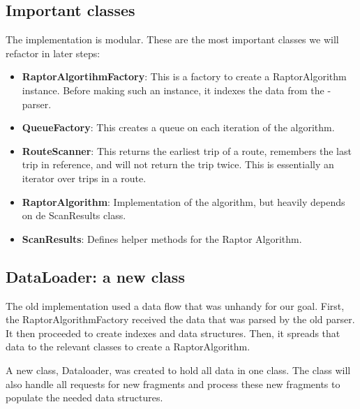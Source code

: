 \subsection{Important classes}
The  implementation is modular. These are the most important classes we will refactor in later steps:
\begin{itemize}
    \item \textbf{RaptorAlgortihmFactory}: This is a factory to create a RaptorAlgorithm instance. Before making such an instance, it indexes the data from the -parser.
    \item \textbf{QueueFactory}: This creates a queue on each iteration of the  algorithm.
    \item \textbf{RouteScanner}: This returns the earliest trip of a route, remembers the last trip in reference, and will not return the trip twice. This is essentially an iterator over trips in a route.
    \item \textbf{RaptorAlgorithm}: Implementation of the  algorithm, but heavily depends on de ScanResults class.
    \item \textbf{ScanResults}: Defines helper methods for the Raptor Algorithm.
\end{itemize}
\subsection{DataLoader: a new class}
The old implementation used a data flow that was unhandy for our goal. First, the RaptorAlgorithmFactory received the data that was parsed by the old parser. It then proceeded to create indexes and data structures. Then, it spreads that data to the relevant classes to create a RaptorAlgorithm.



A new class, Dataloader, was created to hold all data in one class. The class will also handle all requests for new fragments and process these new fragments to populate the needed data structures.

